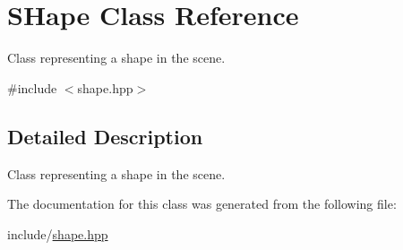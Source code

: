 \hypertarget{class_s_hape}{}\section{S\+Hape Class Reference}
\label{class_s_hape}


Class representing a shape in the scene.  




{\ttfamily \#include $<$shape.\+hpp$>$}



\subsection{Detailed Description}
Class representing a shape in the scene. 

The documentation for this class was generated from the following file\+:\begin{DoxyCompactItemize}
\item 
include/\hyperlink{shape_8hpp}{shape.\+hpp}\end{DoxyCompactItemize}
